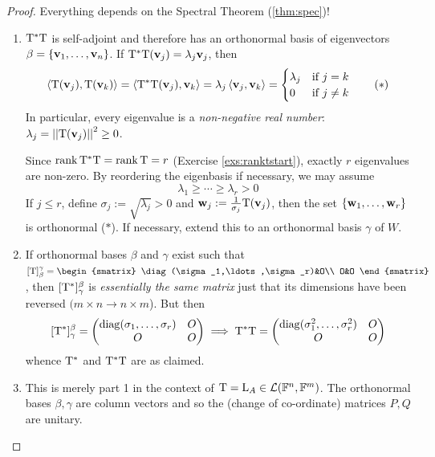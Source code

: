 \pagebreak[3]


\begin{proof}
	Everything depends on the Spectral Theorem (\ref{thm:spec})!
	\begin{enumerate}
	  \item $\mathrm{T}^*\mathrm{T}$ is self-adjoint and therefore has an orthonormal basis of eigenvectors $\beta=\{{\mathbf{{\mathbf{v}}}}_1,\ldots,{\mathbf{{\mathbf{v}}}}_{n}\}$. If $\mathrm{T}^*\mathrm{T}({\mathbf{v}}_j)=\lambda_j{\mathbf{v}}_j$, then
		\[
			\left\langle \mathrm{T}({\mathbf{v}}_j),\mathrm{T}({\mathbf{v}}_k)\right\rangle=\left\langle \mathrm{T}^*\mathrm{T}({\mathbf{v}}_j),{\mathbf{v}}_k\right\rangle =\lambda_j\left\langle {\mathbf{v}}_j,{\mathbf{v}}_k\right\rangle =
			\begin{cases}
				\lambda_j&\text{if }j=k\\
				0&\text{if }j\neq k
			\end{cases} 
			\tag{$\ast$}
		\]
		In particular, every eigenvalue is a \emph{non-negative real number}: $\lambda_j=\left| \left| \mathrm{T}({\mathbf{v}}_j)\right|\right|^2\ge 0$.\par
		Since $\operatorname{rank}\mathrm{T}^*\mathrm{T}=\operatorname{rank}\mathrm{T}=r$ (Exercise \ref{exs:ranktstart}), exactly $r$ eigenvalues are non-zero. By reordering the eigenbasis if necessary, we may assume
		\[
			\lambda_1\ge\cdots\ge\lambda_r>0
		\]
		If $j\le r$, define $\sigma_j:=\sqrt{\lambda_j}>0$ and ${\mathbf{w}}_j:=\frac 1{\sigma_j}\mathrm{T}({\mathbf{v}}_j)$, then the set $\{{\mathbf{{\mathbf{w}}}}_1,\ldots,{\mathbf{{\mathbf{w}}}}_{r}\}$ is orthonormal ($\ast$). If necessary, extend this to an orthonormal basis $\gamma$ of $W$.
		
		\item If orthonormal bases $\beta$ and $\gamma$ exist such that $[\rT]_\beta^\gamma=
		\begin{smatrix}
			\diag(\sigma_1,\ldots,\sigma_r)&O\\
			O&O
		\end{smatrix}$,
		then $[\mathrm{T}^*]_\gamma^\beta$ is \emph{essentially the same matrix} just that its dimensions have been reversed $(m\times n\to n\times m$). But then
		\[
			[\mathrm{T}^*]_\gamma^\beta=
			\begin{pmatrix}
				\operatorname{diag}(\sigma_1,\ldots,\sigma_r)&O\\
				O&O
			\end{pmatrix}
			\implies \mathrm{T}^*\mathrm{T}=
			\begin{pmatrix}
				\operatorname{diag}(\sigma_1^2,\ldots,\sigma_r^2)&O\\
				O&O
			\end{pmatrix}
		\]
		whence $\mathrm{T}^*$ and $\mathrm{T}^*\mathrm{T}$ are as claimed.
		
		\item This is merely part 1 in the context of $\mathrm{T}=\mathrm{L}_A\in\mathcal{L}(\mathbb{F}^n,\mathbb{F}^m)$. The orthonormal bases $\beta,\gamma$ are column vectors and so the (change of co-ordinate) matrices $P,Q$ are unitary.\qedhere
	\end{enumerate}
\end{proof}


